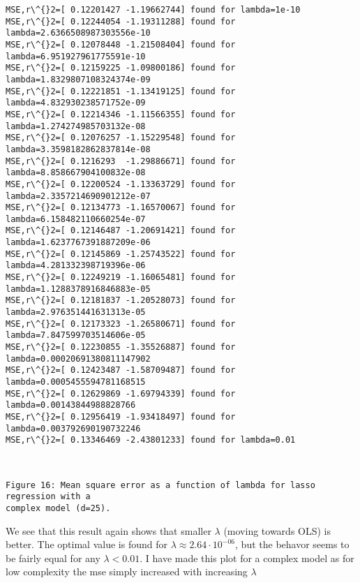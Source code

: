 \documentclass[11pt]{article}
\begin{document}
    \begin{Verbatim}[commandchars=\\\{\}]
MSE,r\^{}2=[ 0.12201427 -1.19662744] found for lambda=1e-10
MSE,r\^{}2=[ 0.12244054 -1.19311288] found for lambda=2.6366508987303556e-10
MSE,r\^{}2=[ 0.12078448 -1.21508404] found for lambda=6.951927961775591e-10
MSE,r\^{}2=[ 0.12159225 -1.09800186] found for lambda=1.8329807108324374e-09
MSE,r\^{}2=[ 0.12221851 -1.13419125] found for lambda=4.832930238571752e-09
MSE,r\^{}2=[ 0.12214346 -1.11566355] found for lambda=1.274274985703132e-08
MSE,r\^{}2=[ 0.12076257 -1.15229548] found for lambda=3.3598182862837814e-08
MSE,r\^{}2=[ 0.1216293  -1.29886671] found for lambda=8.858667904100832e-08
MSE,r\^{}2=[ 0.12200524 -1.13363729] found for lambda=2.3357214690901212e-07
MSE,r\^{}2=[ 0.12134773 -1.16570067] found for lambda=6.158482110660254e-07
MSE,r\^{}2=[ 0.12146487 -1.20691421] found for lambda=1.6237767391887209e-06
MSE,r\^{}2=[ 0.12145869 -1.25743522] found for lambda=4.281332398719396e-06
MSE,r\^{}2=[ 0.12249219 -1.16065481] found for lambda=1.1288378916846883e-05
MSE,r\^{}2=[ 0.12181837 -1.20528073] found for lambda=2.976351441631313e-05
MSE,r\^{}2=[ 0.12173323 -1.26580671] found for lambda=7.847599703514606e-05
MSE,r\^{}2=[ 0.12230855 -1.35526887] found for lambda=0.00020691380811147902
MSE,r\^{}2=[ 0.12423487 -1.58709487] found for lambda=0.0005455594781168515
MSE,r\^{}2=[ 0.12629869 -1.69794339] found for lambda=0.00143844988828766
MSE,r\^{}2=[ 0.12956419 -1.93418497] found for lambda=0.003792690190732246
MSE,r\^{}2=[ 0.13346469 -2.43801233] found for lambda=0.01
    \end{Verbatim}

    \begin{center}
    \end{center}
    { \hspace*{\fill} \\}
    
    \begin{Verbatim}[commandchars=\\\{\}]
Figure 16: Mean square error as a function of lambda for lasso regression with a
complex model (d=25).
    \end{Verbatim}

    We see that this result again shows that smaller \(\lambda\) (moving
towards OLS) is better. The optimal value is found for
\(\lambda\approx 2.64\cdot10^{-06}\), but the behavor seems to be fairly
equal for any \(\lambda<0.01\). I have made this plot for a complex
model as for low complexity the mse simply increased with increasing
\(\lambda\)
\end{document}
